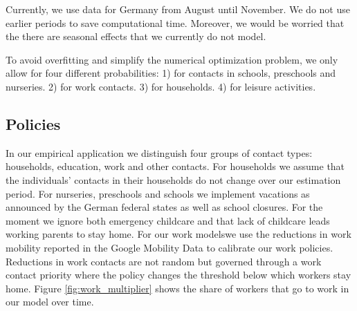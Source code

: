 Currently, we use data for Germany from August until November. We do not use earlier
periods to save computational time. Moreover, we would be worried that the there are
seasonal effects that we currently do not model.

To avoid overfitting and simplify the numerical optimization problem, we only allow for
four different probabilities: 1) for contacts in schools, preschools and nurseries. 2)
for work contacts. 3) for households. 4) for leisure activities.

\subsection{Policies}

\FloatBarrier

In our empirical application we distinguish four groups of contact types: households,
education, work and other contacts. For households we assume that the individuals'
contacts in their households do not change over our estimation period. For nurseries,
preschools and schools we implement vacations as announced by the German federal states
as well as school closures. For the moment we ignore both emergency childcare and that
lack of childcare leads working parents to stay home.
%
%
%
%
For our work models\footnotemark we use the reductions in work mobility reported in the
Google Mobility Data \citep{Google2021} to calibrate our work policies. Reductions in
work contacts are not random but governed through a work contact priority where the
policy changes the threshold below which workers stay home. Figure
\ref{fig:work_multiplier} shows the share of workers that go to work in our model over
time.

